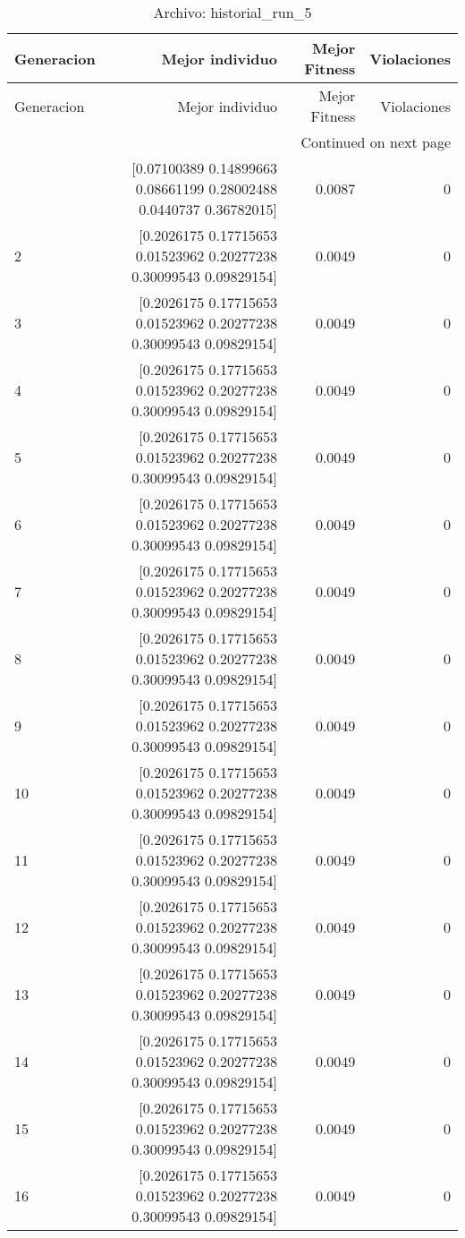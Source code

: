 \begin{longtable}{lrrr}
\caption{Archivo: historial\_run\_5}\label{tab:historial_run_5} \\
\toprule
Generacion & Mejor individuo & Mejor Fitness & Violaciones \\
\midrule
\endfirsthead
\toprule
Generacion & Mejor individuo & Mejor Fitness & Violaciones \\
\midrule
\endhead
\midrule
\multicolumn{4}{r}{Continued on next page} \\
\midrule
\endfoot
\bottomrule
\endlastfoot
1 & [0.07100389 0.14899663 0.08661199 0.28002488 0.0440737  0.36782015] & 0.0087 & 0 \\
2 & [0.2026175  0.17715653 0.01523962 0.20277238 0.30099543 0.09829154] & 0.0049 & 0 \\
3 & [0.2026175  0.17715653 0.01523962 0.20277238 0.30099543 0.09829154] & 0.0049 & 0 \\
4 & [0.2026175  0.17715653 0.01523962 0.20277238 0.30099543 0.09829154] & 0.0049 & 0 \\
5 & [0.2026175  0.17715653 0.01523962 0.20277238 0.30099543 0.09829154] & 0.0049 & 0 \\
6 & [0.2026175  0.17715653 0.01523962 0.20277238 0.30099543 0.09829154] & 0.0049 & 0 \\
7 & [0.2026175  0.17715653 0.01523962 0.20277238 0.30099543 0.09829154] & 0.0049 & 0 \\
8 & [0.2026175  0.17715653 0.01523962 0.20277238 0.30099543 0.09829154] & 0.0049 & 0 \\
9 & [0.2026175  0.17715653 0.01523962 0.20277238 0.30099543 0.09829154] & 0.0049 & 0 \\
10 & [0.2026175  0.17715653 0.01523962 0.20277238 0.30099543 0.09829154] & 0.0049 & 0 \\
11 & [0.2026175  0.17715653 0.01523962 0.20277238 0.30099543 0.09829154] & 0.0049 & 0 \\
12 & [0.2026175  0.17715653 0.01523962 0.20277238 0.30099543 0.09829154] & 0.0049 & 0 \\
13 & [0.2026175  0.17715653 0.01523962 0.20277238 0.30099543 0.09829154] & 0.0049 & 0 \\
14 & [0.2026175  0.17715653 0.01523962 0.20277238 0.30099543 0.09829154] & 0.0049 & 0 \\
15 & [0.2026175  0.17715653 0.01523962 0.20277238 0.30099543 0.09829154] & 0.0049 & 0 \\
16 & [0.2026175  0.17715653 0.01523962 0.20277238 0.30099543 0.09829154] & 0.0049 & 0 \\

\end{longtable}
